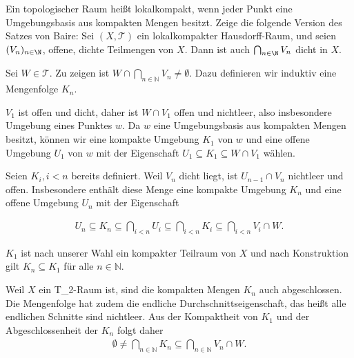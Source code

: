 \begin{exercise}
Ein topologischer Raum heißt lokalkompakt, wenn jeder Punkt eine Umgebungsbasis
aus kompakten Mengen besitzt. Zeige die folgende Version des Satzes von Baire:
Sei $(X,\mathcal{T})$ ein lokalkompakter Hausdorff-Raum, und seien $(V_n)_{n \in \N}$,
offene, dichte Teilmengen von $X$. Dann ist auch $\bigcap_{n \in \N} V_n$ dicht in $X$.
\end{exercise}
\begin{solution}
  Sei $W \in \mathcal{T}.$ Zu zeigen ist $W \cap \bigcap_{n \in \mathbb{N}} V_n \neq \emptyset.$ Dazu definieren wir induktiv eine Mengenfolge $K_n$.

  $V_1$ ist offen und dicht, daher ist $W \cap V_1$ offen und nichtleer, also insbesondere Umgebung eines Punktes $w$. Da $w$ eine Umgebungsbasis aus kompakten Mengen besitzt, können wir eine kompakte Umgebung $K_1$ von $w$ und eine offene Umgebung $U_1$ von $w$ mit der Eigenschaft $U_1 \subseteq K_1 \subseteq W \cap V_1$ wählen.

  Seien $K_i, i < n$ bereits definiert. Weil $V_n$ dicht liegt, ist $U_{n-1} \cap V_n$ nichtleer und offen. Insbesondere enthält diese Menge eine kompakte Umgebung $K_n$ und eine offene Umgebung $U_n$ mit der Eigenschaft

  \begin{align}
      U_n \subseteq K_n \subseteq \bigcap_{i < n} U_i
      \subseteq \bigcap_{i < n} K_i \subseteq \bigcap_{i < n} V_i \cap W.
  \end{align}

  $K_1$ ist nach unserer Wahl ein kompakter Teilraum von $X$ und nach Konstruktion gilt $K_n \subseteq K_1$ für alle $n \in \mathbb{N}$.

  Weil $X$ ein T_2-Raum ist, sind die kompakten Mengen $K_n$ auch abgeschlossen. Die Mengenfolge hat zudem die endliche Durchschnittseigenschaft, das heißt alle endlichen Schnitte sind nichtleer. Aus der Kompaktheit von $K_1$ und der Abgeschlossenheit der $K_n$ folgt daher
  \begin{align}
      \emptyset \neq \bigcap_{n \in \mathbb{N}} K_n \subseteq \bigcap_{n \in \mathbb{N}} V_n \cap W.
  \end{align}
\end{solution}
